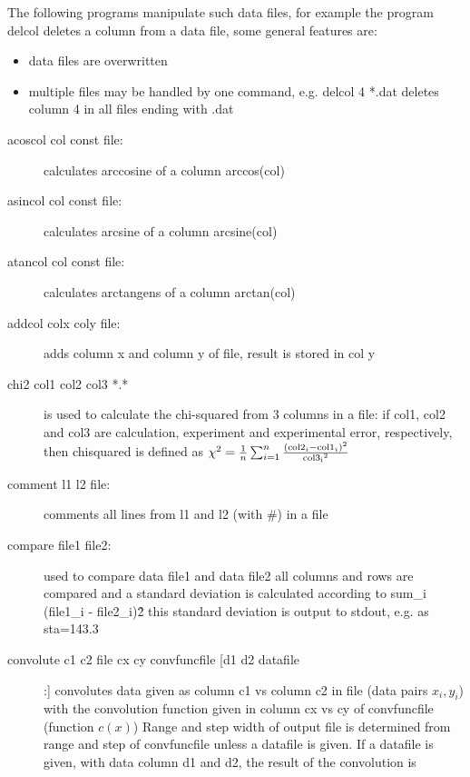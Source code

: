 The following programs manipulate such data files, for example
the program {\prg delcol} deletes a column from a data file,
some general features are:
\begin{itemize}
\item data files are overwritten 
\item multiple files may be handled by one command, e.g. {\prg delcol 4 *.dat} deletes column 4 %
in all 
files ending with .dat
\end{itemize}

\begin{description}
\item [\prg acoscol col const file:] calculates arccosine of a column arccos(col) 
\item [\prg asincol col const file:] calculates arcsine of a column arcsine(col) 
\item [\prg atancol col const file:] calculates arctangens of a column %
arctan(col) 
\item [\prg addcol  colx coly file:] adds column x and column y of file, result is %
stored in col y
\item [\prg chi2 col1 col2 col3 *.*] is used to calculate the 
 chi-squared from 3 columns in a file: if col1, col2 and col3 are calculation, 
 experiment and experimental error, respectively, then
  chisquared is defined as $\chi^2=\frac{1}{n}\sum_{i=1}^n \frac{({\rm col2}_i-{\rm %
col1}_i)^2}{{\rm col3_i}^2}$
\item [\prg comment l1 l2 file:] comments all lines from l1 and l2  (with \#) in a file
\item [\prg compare file1 file2:] used to compare data file1 and data file2
                all columns and rows are compared and a standard deviation
                is calculated according to sum\_i (file1\_i - file2\_i)\^2
                this standard deviation is output to stdout, e.g. as sta=143.3
\item [\prg convolute c1 c2 file cx cy convfuncfile [d1 d2 datafile]:] %
convolutes data given as column c1 vs column
                       c2 in file (data pairs $x_i,y_i$) with the convolution function given in %
column cx vs cy
		        of convfuncfile (function $c(x)$)
		       Range and step width of output file is determined from range and step 
		        of convfuncfile  unless a datafile is given. If a datafile is given, 
		     with data column d1 and d2, the result of the convolution is

\end{description}
